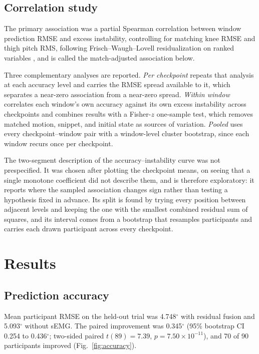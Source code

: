 \documentclass[referee,lineno,pdflatex,sn-vancouver-num]{sn-jnl}
\begin{document}
\subsection{Correlation study}\label{sec:correlation}

The primary association was a partial Spearman correlation between window
prediction RMSE and excess instability, controlling for matching knee RMSE and
thigh pitch RMS, following Frisch--Waugh--Lovell residualization on ranked
variables \cite{spearman1904,frisch1933,lovell1963}, and is called the
match-adjusted association below.

Three complementary analyses are reported. \emph{Per checkpoint} repeats that analysis at each
accuracy level and carries the RMSE spread available to it, which separates a
near-zero association from a near-zero spread.
\emph{Within window} correlates each window's own accuracy against its own excess
instability across checkpoints and combines results with a Fisher-$z$ one-sample
test, which removes matched motion, snippet, and initial state as sources of
variation. \emph{Pooled} uses every checkpoint--window pair with a window-level
cluster bootstrap, since each window recurs once per checkpoint.

The two-segment description of the accuracy--instability curve was not
prespecified. It was chosen after plotting the checkpoint means, on seeing that
a single monotone coefficient did not describe them, and is therefore
exploratory: it reports where the sampled association changes sign rather than
testing a hypothesis fixed in advance. Its split is found by trying every
position between adjacent levels and keeping the one with the smallest combined
residual sum of squares, and its interval comes from a bootstrap that resamples
participants and carries each drawn participant across every checkpoint.

\section{Results}\label{sec:results}

\subsection{Prediction accuracy}

Mean participant RMSE on the held-out trial was
4.748$^{\circ}$ with residual fusion
and 5.093$^{\circ}$ without sEMG. The
paired improvement was 0.345$^{\circ}$ (95\%
bootstrap CI 0.254 to 0.436$^{\circ}$; two-sided
paired $t(89)=7.39$, $p=7.50\times10^{-11}$), and
70 of 90
participants improved (Fig.~\ref{fig:accuracy}).
\end{document}
